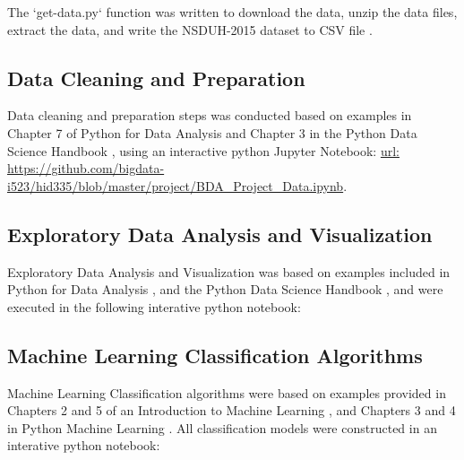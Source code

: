 \documentclass[sigconf]{acmart}
\begin{document}
The `get-data.py` function was written to download the data, unzip the data
files, extract the data, and write the NSDUH-2015 dataset to CSV file 
\cite{getdata17}.

\subsection{Data Cleaning and Preparation \cite{mckinney17}}

Data cleaning and preparation steps was conducted based on examples in 
Chapter 7 of Python for Data Analysis \cite{mckinney17} and Chapter 3 in 
the Python Data Science Handbook \cite{vanderplas17}, using an interactive 
python Jupyter Notebook: \url{url: https://github.com/bigdata-i523/hid335/blob/master/project/BDA_Project_Data.ipynb}.

\subsection{Exploratory Data Analysis and Visualization\cite{vanderplas17}}

Exploratory Data Analysis and Visualization was based on examples included
in Python for Data Analysis \cite{mckinney17}, and the Python Data Science 
Handbook \cite{vanderplas17}, and were executed in the following interative
python notebook: 


\subsection{Machine Learning Classification Algorithms\cite{muller17, raschka17}}
Machine Learning Classification algorithms were based on examples provided
in Chapters 2 and 5 of an Introduction to Machine Learning \cite{muller17},
and Chapters 3 and 4 in Python Machine Learning \cite{raschka17}. All 
classification models were constructed in an interative python notebook: 





%
\end{document}
